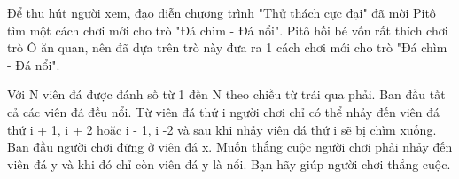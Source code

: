 Để thu hút người xem, đạo diễn chương trình "Thử thách cực đại" đã mời Pitô tìm một cách chơi mới cho trò "Đá chìm - Đá nổi". Pitô hồi bé vốn rất thích chơi trò Ô ăn quan, nên đã dựa trên trò này đưa ra 1 cách chơi mới cho trò "Đá chìm - Đá nổi".  

   Với N viên đá được đánh số từ 1 đến N theo chiều từ trái qua phải. Ban đầu tất cả các viên đá đều nổi. Từ viên đá thứ i người chơi chỉ có thể nhảy đến viên đá thứ i + 1, i + 2 hoặc i - 1, i -2 và sau khi nhảy viên đá thứ i sẽ bị chìm xuống. Ban đầu người chơi đứng ở viên đá x. Muốn thắng cuộc người chơi phải nhảy đến viên đá y và khi đó chỉ còn viên đá y là nổi. Bạn hãy giúp người chơi thắng cuộc.  



\